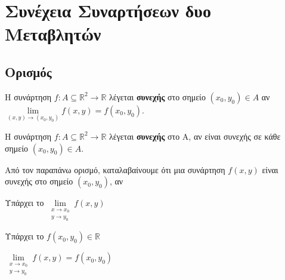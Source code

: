 \documentclass[a4paper,11pt]{report}
\begin{document}
\chapter{Συνέχεια Συναρτήσεων δυο Μεταβλητών}

\section{Ορισμός}

\begin{mybox1}
  \begin{dfn}
    Η συνάρτηση $ f \colon A \subseteq \mathbb{R}^{2} \to \mathbb{R} $ 
    λέγεται \textcolor{Col1}{\textbf{συνεχής}} στο σημείο $ (x_{0}, y_{0}) \in A $ αν 
    $ \lim\limits_{(x,y)\to (x_{0}, y_{0})} f(x,y) = f(x_{0}, y_{0}) $.
  \end{dfn}
\end{mybox1}

\begin{mybox1}
  \begin{dfn}
    Η συνάρτηση $ f \colon A \subseteq \mathbb{R}^{2} \to \mathbb{R} $ 
    λέγεται \textcolor{Col1}{\textbf{συνεχής}} στο Α, αν είναι συνεχής σε κάθε σημείο 
    $ (x_{0}, y_{0}) \in A $.
  \end{dfn}
\end{mybox1}

\begin{rem}
  Από τον παραπάνω ορισμό, καταλαβαίνουμε ότι μια συνάρτηση $ f(x,y) $ 
  είναι συνεχής στο σημείο $ (x_{0}, y_{0}) $, αν
  \begin{myitemize}
    \item Υπάρχει το $ \lim\limits_{\substack{x\to x_{0} \\y \to y_{0}}} f(x,y) $
    \item Υπάρχει το $ f(x_{0}, y_{0}) \in \mathbb{R} $
    \item $  \lim\limits_{\substack{x\to x_{0} \\ y \to y_{0}}} f(x,y) = 
      f(x_{0}, y_{0}) $
  \end{myitemize}
\end{rem}
\end{document}
